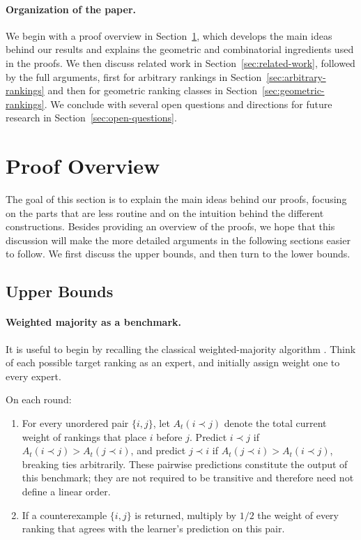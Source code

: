 \documentclass[11pt]{article}
\theoremstyle{definition}
\theoremstyle{remark}
\begin{document}
\paragraph{Organization of the paper.}
We begin with a proof overview in Section~\ref{sec:proof-overview}, which
develops the main ideas behind our results and explains the geometric and
combinatorial ingredients used in the proofs. We then discuss related work
in Section~\ref{sec:related-work}, followed by the full arguments, first for
arbitrary rankings in Section~\ref{sec:arbitrary-rankings} and then for
geometric ranking classes in Section~\ref{sec:geometric-rankings}. We
conclude with several open questions and directions for future research in
Section~\ref{sec:open-questions}.



\section{Proof Overview}
\label{sec:proof-overview}

The goal of this section is to explain the main ideas behind our proofs,
focusing on the parts that are less routine and on the intuition behind the
different constructions. Besides providing an overview of the proofs, we hope
that this discussion will make the more detailed arguments in the following
sections easier to follow. We first discuss the upper bounds, and then turn to
the lower bounds.

\subsection{Upper Bounds}

\paragraph{Weighted majority as a benchmark.}
It is useful to begin by recalling the classical weighted-majority algorithm
\cite{LittlestoneWarmuth1994}. Think of each possible target ranking as an
expert, and initially assign weight one to every expert.

\begin{algorithmbox}
On each round:
\begin{enumerate}
    \item For every unordered pair $\{i,j\}$, let $A_t(i\prec j)$ denote
    the total current weight of rankings that place $i$ before $j$.
    Predict $i\prec j$ if
    \(A_t(i\prec j)> A_t(j\prec i)\),
    and predict $j\prec i$ if  \(A_t(j\prec i)> A_t(i\prec j)\), breaking ties arbitrarily.
    These pairwise predictions constitute the output of this benchmark;
    they are not required to be transitive and therefore need not define
    a linear order.

    \item If a counterexample $\{i,j\}$ is returned, multiply by $1/2$
    the weight of every ranking that agrees with the learner's prediction
    on this pair.
\end{enumerate}
\end{algorithmbox}
\end{document}

